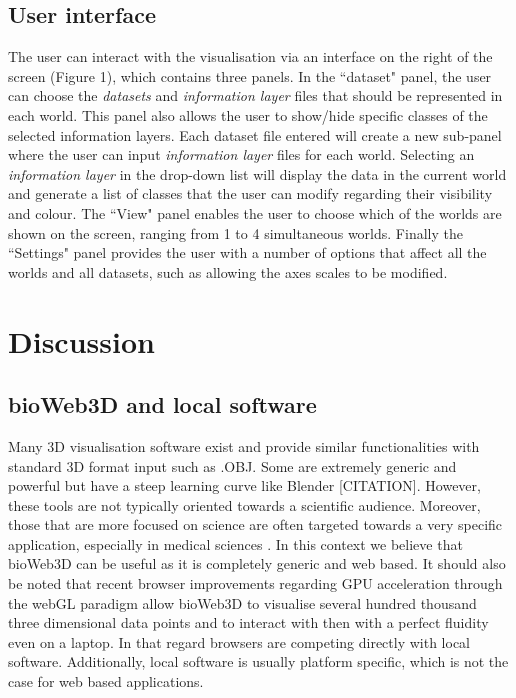 \documentclass{bioinfo}
\begin{document}
\subsection{User interface}
The user can interact with the visualisation via an interface on the right of the screen (Figure 1), which contains three panels. In the ``dataset" panel, the user can choose the {\it{datasets}} and {\it{information layer}} files that should be represented in each world. This panel also allows the user to show/hide specific classes of the selected information layers. Each dataset file entered will create a new sub-panel where the user can input {\it{information layer}} files for each world. Selecting an {\it{information layer}} in the drop-down list will display the data in the current world and generate a list of classes that the user can modify regarding their visibility and colour. The ``View" panel enables the user to choose which of the worlds are shown on the screen, ranging from 1 to 4 simultaneous worlds. Finally the ``Settings" panel provides the user with a number of options that affect all the worlds and all datasets, such as allowing the axes scales to be modified.


\section{Discussion}
	\subsection{bioWeb3D and local software}
Many 3D visualisation software exist and provide similar functionalities with standard 3D format input such as .OBJ. Some are extremely generic and powerful but have a steep learning curve like Blender [CITATION]. However, these tools are not typically oriented towards a scientific audience. Moreover, those that are more focused on science are often targeted towards a very specific application, especially in medical sciences \citep{Wang09}. In this context we believe that bioWeb3D can be useful as it is completely generic and web based. It should also be noted that recent browser improvements regarding GPU acceleration through the webGL paradigm allow bioWeb3D to visualise several hundred thousand three dimensional data points and to interact with then with a perfect fluidity even on a laptop. In that regard browsers are competing directly with local software. Additionally, local software is usually platform specific, which is not the case for web based applications.
\end{document}
